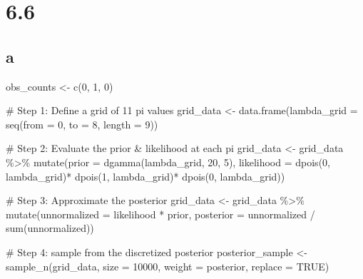 \documentclass[
  letterpaper,
  DIV=11,
  numbers=noendperiod]{scrartcl}
\newenvironment{Shaded}{\begin{snugshade}}{\end{snugshade}}
\newcommand{\AttributeTok}[1]{\textcolor[rgb]{0.40,0.45,0.13}{#1}}
\newcommand{\CommentTok}[1]{\textcolor[rgb]{0.37,0.37,0.37}{#1}}
\newcommand{\ConstantTok}[1]{\textcolor[rgb]{0.56,0.35,0.01}{#1}}
\newcommand{\DecValTok}[1]{\textcolor[rgb]{0.68,0.00,0.00}{#1}}
\newcommand{\FunctionTok}[1]{\textcolor[rgb]{0.28,0.35,0.67}{#1}}
\newcommand{\NormalTok}[1]{\textcolor[rgb]{0.00,0.23,0.31}{#1}}
\newcommand{\OtherTok}[1]{\textcolor[rgb]{0.00,0.23,0.31}{#1}}
\newcommand{\SpecialCharTok}[1]{\textcolor[rgb]{0.37,0.37,0.37}{#1}}
\begin{document}
\hypertarget{section-5}{%
\section{6.6}\label{section-5}}

\hypertarget{a-5}{%
\subsection{a}\label{a-5}}

\begin{Shaded}
\begin{Highlighting}[]
\NormalTok{obs\_counts }\OtherTok{\textless{}{-}} \FunctionTok{c}\NormalTok{(}\DecValTok{0}\NormalTok{, }\DecValTok{1}\NormalTok{, }\DecValTok{0}\NormalTok{)}

\CommentTok{\# Step 1: Define a grid of 11 pi values}
\NormalTok{grid\_data }\OtherTok{\textless{}{-}} \FunctionTok{data.frame}\NormalTok{(}\AttributeTok{lambda\_grid =} \FunctionTok{seq}\NormalTok{(}\AttributeTok{from =} \DecValTok{0}\NormalTok{, }\AttributeTok{to =} \DecValTok{8}\NormalTok{, }
                                      \AttributeTok{length =} \DecValTok{9}\NormalTok{))}

\CommentTok{\# Step 2: Evaluate the prior \& likelihood at each pi}
\NormalTok{grid\_data }\OtherTok{\textless{}{-}}\NormalTok{ grid\_data }\SpecialCharTok{\%\textgreater{}\%} 
  \FunctionTok{mutate}\NormalTok{(}\AttributeTok{prior =} \FunctionTok{dgamma}\NormalTok{(lambda\_grid, }\DecValTok{20}\NormalTok{, }\DecValTok{5}\NormalTok{),}
         \AttributeTok{likelihood =} \FunctionTok{dpois}\NormalTok{(}\DecValTok{0}\NormalTok{, lambda\_grid)}\SpecialCharTok{*}
           \FunctionTok{dpois}\NormalTok{(}\DecValTok{1}\NormalTok{, lambda\_grid)}\SpecialCharTok{*}
           \FunctionTok{dpois}\NormalTok{(}\DecValTok{0}\NormalTok{, lambda\_grid))}

\CommentTok{\# Step 3: Approximate the posterior}
\NormalTok{grid\_data }\OtherTok{\textless{}{-}}\NormalTok{ grid\_data }\SpecialCharTok{\%\textgreater{}\%} 
  \FunctionTok{mutate}\NormalTok{(}\AttributeTok{unnormalized =}\NormalTok{ likelihood }\SpecialCharTok{*}\NormalTok{ prior,}
         \AttributeTok{posterior =}\NormalTok{ unnormalized }\SpecialCharTok{/} \FunctionTok{sum}\NormalTok{(unnormalized))}

\CommentTok{\# Step 4: sample from the discretized posterior}
\NormalTok{posterior\_sample }\OtherTok{\textless{}{-}} \FunctionTok{sample\_n}\NormalTok{(grid\_data, }
                             \AttributeTok{size =} \DecValTok{10000}\NormalTok{, }
                             \AttributeTok{weight =}\NormalTok{ posterior, }
                             \AttributeTok{replace =} \ConstantTok{TRUE}\NormalTok{)}


\end{Highlighting}
\end{Shaded}
\end{document}
